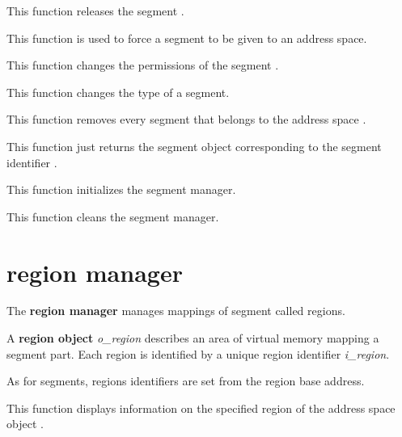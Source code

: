 	 {
	   This function releases the segment .
	 }

	 {
	   This function is used to force a segment to be given to an address
	   space.

	 }

	 {
	   This function changes the permissions of the segment .
	 }

	 {
	   This function changes the type of a segment.
	 }

	 {
	   This function removes every segment that belongs to the
	   address space .
	 }

	 {
	   This function just returns the segment object
	   corresponding to the segment identifier .
	 }

	 {
	   This function initializes the segment manager.
	 }

	 {
	   This function cleans the segment manager.
	 }

%
%

\section{region manager}

The \textbf{region manager} manages mappings of segment called regions.

A \textbf{region object} \textit{o\_region} describes an area of virtual
memory mapping a segment part. Each region is identified by a unique region
identifier \textit{i\_region}.

As for segments, regions identifiers are set from the region base address.

	 {
	   This function displays information on the specified region
	    of the address space object .
	 }

